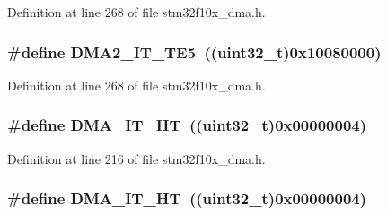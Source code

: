 Definition at line 268 of file stm32f10x\+\_\+dma.\+h.

\subsubsection[{\texorpdfstring{D\+M\+A2\+\_\+\+I\+T\+\_\+\+T\+E5}{DMA2_IT_TE5}}]{\setlength{\rightskip}{0pt plus 5cm}\#define D\+M\+A2\+\_\+\+I\+T\+\_\+\+T\+E5~(({\bf uint32\+\_\+t})0x10080000)}\hypertarget{group___d_m_a__interrupts__definition_gad47115e9a4d0d3f5d9101097983b5525}{}\label{group___d_m_a__interrupts__definition_gad47115e9a4d0d3f5d9101097983b5525}


Definition at line 268 of file stm32f10x\+\_\+dma.\+h.

\subsubsection[{\texorpdfstring{D\+M\+A\+\_\+\+I\+T\+\_\+\+HT}{DMA_IT_HT}}]{\setlength{\rightskip}{0pt plus 5cm}\#define D\+M\+A\+\_\+\+I\+T\+\_\+\+HT~(({\bf uint32\+\_\+t})0x00000004)}\hypertarget{group___d_m_a__interrupts__definition_gadf11c572b9797e04a14b105fdc2e5f66}{}\label{group___d_m_a__interrupts__definition_gadf11c572b9797e04a14b105fdc2e5f66}


Definition at line 216 of file stm32f10x\+\_\+dma.\+h.

\subsubsection[{\texorpdfstring{D\+M\+A\+\_\+\+I\+T\+\_\+\+HT}{DMA_IT_HT}}]{\setlength{\rightskip}{0pt plus 5cm}\#define D\+M\+A\+\_\+\+I\+T\+\_\+\+HT~(({\bf uint32\+\_\+t})0x00000004)}\hypertarget{group___d_m_a__interrupts__definition_gadf11c572b9797e04a14b105fdc2e5f66}{}\label{group___d_m_a__interrupts__definition_gadf11c572b9797e04a14b105fdc2e5f66}


